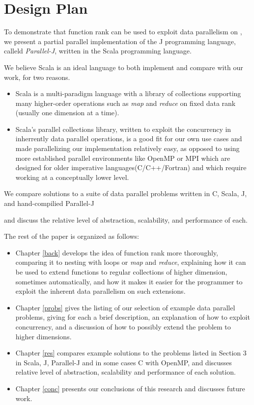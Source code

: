 \section{Design Plan}
To demonstrate that function rank can be used to exploit data parallelism on , we present a partial parallel implementation of the J programming language, calleld \textit{Parallel-J}, written in the Scala programming language.\begin{comment}TODO cite?\end{comment}
We believe Scala is an ideal language to both implement and compare with our work, for two reasons.
\begin{itemize}
    \item Scala is a multi-paradigm language with a library of collections supporting many higher-order operations such as \textit{map} and \textit{reduce} on fixed data rank (usually one dimension at a time). %
    \item Scala's parallel collections library\cite{pc}, written to exploit the concurrency in inherrently data parallel operations, is a good fit for our own use cases and made parallelizing our implementation relatively easy, as opposed to using more established parallel environments like OpenMP or MPI which are designed for older imperative languages(C/C++/Fortran) and which require working at a conceptually lower level.
\end{itemize}
We compare solutions to a suite of data parallel problems written in C, Scala, J, and hand-compilied Parallel-J\begin{comment}TODO really should change name\end{comment} and discuss the relative level of abstraction, scalability, and performance of each.

The rest of the paper is organized as follows:
\begin{itemize}
    \item Chapter \ref{back} develops the idea of function rank more thoroughly, comparing it to nesting with loops or \textit{map} and \textit{reduce}, explaining how it can be used to extend functions to regular collections of higher dimension, sometimes automatically, and how it makes it easier for the programmer to exploit the inherent data parallelism on such extensions. 
    \item Chapter \ref{probs} gives the listing of our selection of example data parallel problems, giving for each a brief description, an explanation of how to exploit concurrency, and a discussion of how to possibly extend the problem to higher dimensions.
    \item Chapter \ref{res} compares example solutions to the problems listed in Section 3 in Scala, J, Parallel-J and in some cases C with OpenMP, and discusses relative level of abstraction, scalability and performance of each solution. 
    \item Chapter \ref{conc} presents our conclusions of this research and discusses future work.
\end{itemize}

